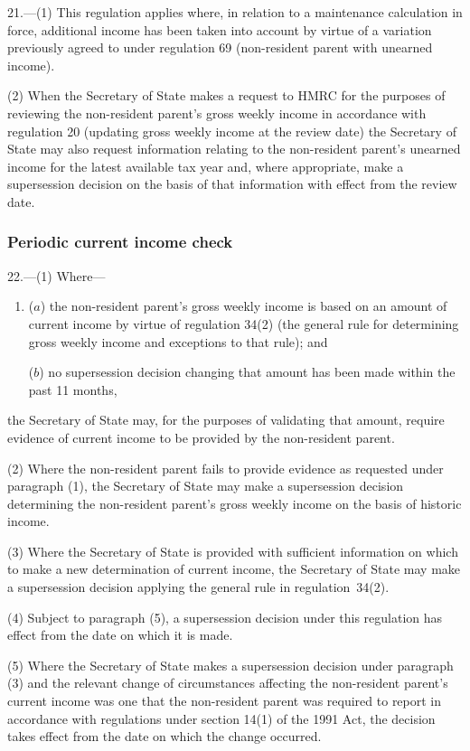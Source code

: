 \documentclass[12pt,a4paper]{article}
\begin{document}
21.---(1)  This regulation applies where, in relation to a maintenance calculation in force, additional income has been taken into account by virtue of a variation previously agreed to under regulation 69 (non-resident parent with unearned income).

(2) When the Secretary of State makes a request to HMRC for the purposes of reviewing the non-resident parent’s gross weekly income in accordance with regulation 20 (updating gross weekly income at the review date) the Secretary of State may also request information relating to the non-resident parent’s unearned income for the latest available tax year and, where appropriate, make a supersession decision on the basis of that information with effect from the review date.

\subsubsection[22. Periodic current income check]{Periodic current income check}

22.---(1)  Where—
\begin{enumerate}\item[]
($a$) the non-resident parent’s gross weekly income is based on an amount of current income by virtue of regulation 34(2) (the general rule for determining gross weekly income and exceptions to that rule); and

($b$) no supersession decision changing that amount has been made within the past 11 months,
\end{enumerate}
the Secretary of State may, for the purposes of validating that amount, require evidence of current income to be provided by the non-resident parent.

(2) Where the non-resident parent fails to provide evidence as requested under paragraph (1), the Secretary of State may make a supersession decision determining the non-resident parent’s gross weekly income on the basis of historic income.

(3) Where the Secretary of State is provided with sufficient information on which to make a new determination of current income, the Secretary of State may make a supersession decision applying the general rule in regulation~34(2).

(4) Subject to paragraph (5), a supersession decision under this regulation has effect from the date on which it is made.

(5) Where the Secretary of State makes a supersession decision under paragraph (3) and the relevant change of circumstances affecting the non-resident parent’s current income was one that the non-resident parent was required to report in accordance with regulations under section 14(1) of the 1991 Act, the decision takes effect from the date on which the change occurred.
\end{document}
